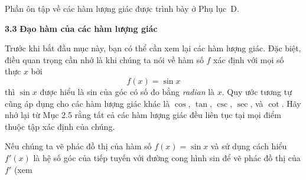 \vspace{2.5em}

\noindent
\begin{minipage}[t]{0.26\textwidth}
    \vspace{0pt}%

    \vspace{1.8em}
    \fontsize{8pt}{10.5pt}\selectfont\color{black!85}
    Phần ôn tập về các hàm lượng giác được trình bày ở Phụ lục~D.
\end{minipage}%
\hfill
\begin{minipage}[t]{0.70\textwidth}
    \vspace{0pt}%
    {\fontsize{24pt}{24pt}\selectfont\bfseries\color{stewartcyan} 3.3}%
    \hspace{0.5em}%
    {\fontsize{16pt}{18pt}\selectfont\bfseries Đạo hàm của các hàm lượng giác}

    \vspace{1.2em}
    \fontsize{9.5pt}{12.5pt}\selectfont
    Trước khi bắt đầu mục này, bạn có thể cần xem lại các hàm lượng giác. Đặc biệt, điều quan trọng cần nhớ là khi chúng ta nói về hàm số $f$ xác định với mọi số thực $x$ bởi
    \[
    f(x) = \sin x
    \]
    thì $\sin x$ được hiểu là sin của góc có số đo bằng \textit{radian} là $x$. Quy ước tương tự cũng áp dụng cho các hàm lượng giác khác là $\cos$, $\tan$, $\csc$, $\sec$, và $\cot$. Hãy nhớ lại từ Mục 2.5 rằng tất cả các hàm lượng giác đều liên tục tại mọi điểm thuộc tập xác định của chúng.

    \vspace{1.2em}
    \noindent{\color{stewartcyan}\raisebox{0.1ex}{\rule{1.1ex}{1.1ex}}}

    \vspace{0.6em}
    Nếu chúng ta vẽ phác đồ thị của hàm số $f(x) = \sin x$ và sử dụng cách hiểu $f'(x)$ là hệ số góc của tiếp tuyến với đường cong hình sin để vẽ phác đồ thị của $f'$ (xem
\end{minipage}
